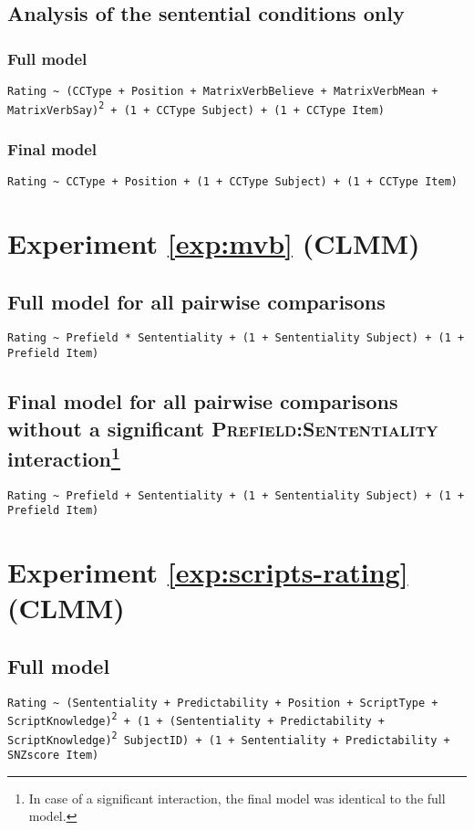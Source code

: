 \subsection*{Analysis of the sentential conditions only}
\subsubsection{Full model}
\texttt{Rating \textasciitilde {} (CCType + Position + MatrixVerbBelieve + MatrixVerbMean + MatrixVerbSay)\textsuperscript{2} + (1 + CCType  {}\textbar {} Subject) + (1 + CCType  {}\textbar {} Item)}

\subsubsection{Final model}
\texttt{Rating \textasciitilde {} CCType + Position + (1 + CCType  {}\textbar {} Subject) + (1 + CCType  {}\textbar {} Item)}

\section*{Experiment \ref{exp:mvb} (CLMM)}
\subsection*{Full model for all pairwise comparisons}
\texttt{Rating \textasciitilde {} Prefield * Sententiality + (1 + Sententiality  {}\textbar {} Subject) + (1 + Prefield  {}\textbar {} Item) }

\subsection*{Final model for all pairwise comparisons without a significant \textsc{Prefield:Sententiality} interaction\footnote{In case of a significant interaction, the final model was identical to the full model.}}
\texttt{Rating \textasciitilde {} Prefield + Sententiality + (1 + Sententiality  {}\textbar {} Subject) + (1 + Prefield  {}\textbar {} Item)}

\section*{Experiment \ref{exp:scripts-rating} (CLMM)}
\subsection*{Full model}
\texttt{Rating \textasciitilde {} (Sententiality + Predictability + Position + ScriptType + ScriptKnowledge)\textsuperscript{2} + (1 + (Sententiality + Predictability + \linebreak ScriptKnowledge)\textsuperscript{2}  {}\textbar {} SubjectID) + (1 + Sententiality + Predictability + SNZscore  {}\textbar {} Item)}

